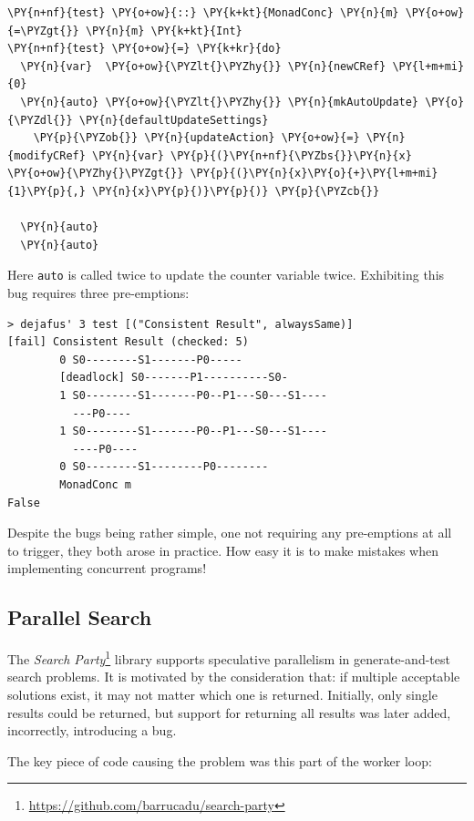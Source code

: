 \begin{Verbatim}[commandchars=\\\{\}]
\PY{n+nf}{test} \PY{o+ow}{::} \PY{k+kt}{MonadConc} \PY{n}{m} \PY{o+ow}{=\PYZgt{}} \PY{n}{m} \PY{k+kt}{Int}
\PY{n+nf}{test} \PY{o+ow}{=} \PY{k+kr}{do}
  \PY{n}{var}  \PY{o+ow}{\PYZlt{}\PYZhy{}} \PY{n}{newCRef} \PY{l+m+mi}{0}
  \PY{n}{auto} \PY{o+ow}{\PYZlt{}\PYZhy{}} \PY{n}{mkAutoUpdate} \PY{o}{\PYZdl{}} \PY{n}{defaultUpdateSettings}
    \PY{p}{\PYZob{}} \PY{n}{updateAction} \PY{o+ow}{=} \PY{n}{modifyCRef} \PY{n}{var} \PY{p}{(}\PY{n+nf}{\PYZbs{}}\PY{n}{x} \PY{o+ow}{\PYZhy{}\PYZgt{}} \PY{p}{(}\PY{n}{x}\PY{o}{+}\PY{l+m+mi}{1}\PY{p}{,} \PY{n}{x}\PY{p}{)}\PY{p}{)} \PY{p}{\PYZcb{}}

  \PY{n}{auto}
  \PY{n}{auto}
\end{Verbatim}

Here \texttt{auto} is called twice to update the counter variable
twice. Exhibiting this bug requires three pre-emptions:

\begin{verbatim}
> dejafus' 3 test [("Consistent Result", alwaysSame)]
[fail] Consistent Result (checked: 5)
        0 S0--------S1-------P0-----
        [deadlock] S0-------P1----------S0-
        1 S0--------S1-------P0--P1---S0---S1----
          ---P0----
        1 S0--------S1-------P0--P1---S0---S1----
          ----P0----
        0 S0--------S1--------P0--------
        MonadConc m
False
\end{verbatim}

Despite the bugs being rather simple, one not requiring any
pre-emptions at all to trigger, they both arose in practice. How easy
it is to make mistakes when implementing concurrent programs!

\subsection*{Parallel Search}
\label{sec:dejafu-example-searchparty}

The \textit{Search
  Party}\footnote{\url{https://github.com/barrucadu/search-party}}
library supports speculative parallelism in generate-and-test search
problems. It is motivated by the consideration that: if multiple
acceptable solutions exist, it may not matter which one is
returned. Initially, only single results could be returned, but
support for returning all results was later added, incorrectly,
introducing a bug.

The key piece of code causing the problem was this part of the worker
loop:

